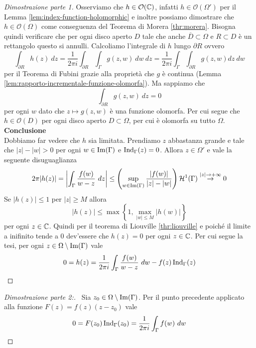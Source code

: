 \begin{proof}[Dimostrazione parte 1]
    Osserviamo che $h \in \mathcal{O}(\mathbb{C})$, infatti $h \in
    \mathcal{O}(\Omega')$ per il Lemma \ref{lem:index-function-holomorphic}
    e inoltre possiamo dimostrare che $h \in \mathcal{O}(\Omega)$ come
    conseguenza del Teorema di Morera \ref{thr:morera}. 
    Bisogna quindi verificare che per ogni disco aperto $D$ tale che anche 
    $\overline{D}\subset \Omega$ e $R \subset D$ è un rettangolo questo si
    annulli. Calcoliamo l'integrale di $h$ lungo $\partial R$ ovvero 
    \begin{equation*}
      \int_{\partial R} h(z)\ dz = \frac{1}{2\pi i} \int_{\partial
      R}\int_\Gamma g(z,w)\ dw\ dz = \frac{1}{2\pi i} \int_\Gamma
      \int_{\partial R} g(z,w) dz\ dw
    \end{equation*}
    per il Teorema di Fubini grazie alla proprietà che $g$ è continua (Lemma
    \ref{lem:rapporto-incrementale-funzione-olomorfa}). Ma sappiamo che 
    \begin{equation*}
      \int_{\partial R} g(z,w) \ dz = 0  
    \end{equation*}
    per ogni $w$ dato che $z \mapsto g(z,w)$ è una funzione olomorfa. Per
    cui segue che $h \in \mathcal{O}(D)$ per ogni disco aperto $D \subset
    \Omega$, per cui è olomorfa su tutto $\Omega$.\\

    \textbf{Conclusione}\\

    Dobbiamo far vedere che $h$ sia limitata. Prendiamo $z$ abbastanza
    grande e tale che $|z| - |w| > 0$ per ogni $w \in \operatorname{Im}(\Gamma)$
    e $\operatorname{Ind}_\Gamma(z) = 0$. Allora $z \in \Omega'$ e vale la
    seguente disuguaglianza
    \begin{equation*}
      2\pi |h(z)| = \left|\int_\Gamma \frac{f(w)}{w-z}\ dz \right| \le
      \left( \sup_{w \in \operatorname{Im}(\Gamma)} \frac{|f(w)|}{|z|-|w|} \right)
        \mathcal{H}^1(\Gamma) \overset{|z|\to+\infty}{\to} 0
    \end{equation*}
    Se $|h(z)| \le 1$ per $|z| \ge M$ allora 
    \begin{equation*}
      |h(z)| \le \max \left\{1,\max_{|w| \le M} |h(w)|\right\}
    \end{equation*}
    per ogni $z \in \mathbb{C}$. Quindi per il teorema di Liouville
    \ref{thr:liouville} e poiché il limite a inifinito tende a $0$
    dev'essere che $h(z) = 0$ per ogni $z \in \mathbb{C}$. Per cui segue la tesi, 
    per ogni $z \in \Omega \setminus \operatorname{Im}(\Gamma)$ vale 
    \begin{equation*}
      0 = h(z) = \frac{1}{2 \pi i} \int_\Gamma \frac{f(w)}{w-z}\ dw - f(z)
      \operatorname{Ind}_\Gamma(z)  
    \end{equation*}
\end{proof}
\begin{proof}[Dimostrazione parte 2:]\
  Sia $z_0 \in \Omega \setminus \operatorname{Im}(\Gamma)$. Per il punto precedente
    applicato alla funzione $F(z) = f(z)(z-z_0)$ vale
    \begin{equation*}
      0 = F(z_0)\operatorname{Ind}_\Gamma(z_0) = \frac{1}{2 \pi i}
      \int_\Gamma f(w)\ dw
    \end{equation*}
\end{proof}


